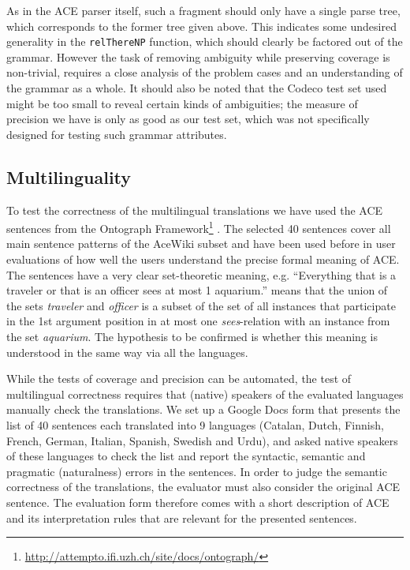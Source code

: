 \documentclass[a4paper]{article}
\begin{document}
As in the ACE parser itself, such a fragment should only have a single
parse tree, which corresponds to the former tree given above. This
indicates some undesired generality in the \verb|relThereNP| function,
which should clearly be factored out of the grammar. However the task
of removing ambiguity while preserving coverage is non-trivial,
requires a close analysis of the problem cases and an understanding of
the grammar as a whole.
It should also be noted that the Codeco test set used might be
too small to reveal certain kinds of ambiguities; the measure of precision we
have is only as good as our test set, which was not specifically designed for
testing such grammar attributes.

\subsection{Multilinguality}

To test the correctness of the multilingual translations we have used
the ACE sentences from the
Ontograph
Framework\footnote{\url{http://attempto.ifi.uzh.ch/site/docs/ontograph/}}
\cite{kuhn2009cnlmain}. The selected 40 sentences cover all main sentence
patterns of the AceWiki subset and have been used before in user
evaluations of how well the users understand the precise formal meaning of ACE.
The sentences have a very clear set-theoretic meaning, e.g.
``Everything that is a traveler or that is an officer sees
at most 1 aquarium.'' means that the union of the sets \emph{traveler} and
\emph{officer} is a subset of the set of all instances that participate in
the 1st argument position in at most one \emph{sees}-relation with an
instance from the set \emph{aquarium}.
The hypothesis to be confirmed is whether this meaning is understood in
the same way via all the languages.

While the tests of coverage and precision can be automated, the test
of multilingual correctness requires that (native) speakers of the
evaluated languages manually check the translations. We set up a
Google Docs form that presents the list of 40 sentences each
translated into 9 languages (Catalan, Dutch, Finnish, French, German,
Italian, Spanish, Swedish and Urdu), and asked native speakers of
these languages to check the list and report the syntactic, semantic
and pragmatic (naturalness) errors in the sentences.  In order to
judge the semantic correctness of the translations, the evaluator must
also consider the original ACE sentence. The evaluation form therefore
comes with a short description of ACE and its interpretation rules
that are relevant for the presented sentences.
\end{document}
